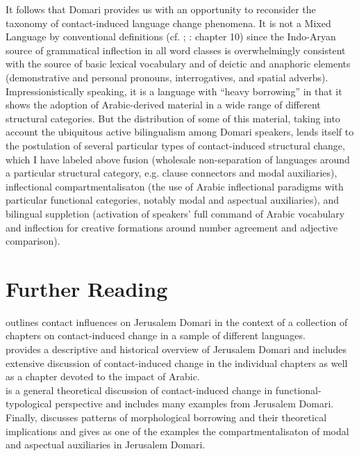 \documentclass[output=paper]{langsci/langscibook}
\begin{document}
It follows that Domari provides us with an opportunity to reconsider the taxonomy of contact-induced language change phenomena. It is not a Mixed Language by conventional definitions (cf. \citealt{BakkerMatras2013}; \citealt{Matras2009}: chapter 10) since the Indo-Aryan source of grammatical inflection in all word classes is overwhelmingly consistent with the source of basic lexical vocabulary and of deictic and anaphoric elements (demonstrative and personal pronouns, interrogatives, and spatial adverbs). Impressionistically speaking, it is a language with ``heavy borrowing'' in that it shows the adoption of Arabic-derived material in a wide range of different structural categories. But the distribution of some of this material, taking into account the ubiquitous active bilingualism among Domari speakers,  lends itself to the postulation of several particular types of contact-induced structural change, which I have labeled above fusion (wholesale non-separation of languages around a particular structural category, e.g. clause connectors and modal auxiliaries), inflectional compartmentalisaton (the use of Arabic inflectional paradigms with particular functional categories, notably modal and aspectual auxiliaries), and bilingual suppletion (activation of speakers’ full command of Arabic vocabulary and inflection for creative formations around number agreement and adjective comparison).

\section*{Further Reading}

\citet{Matras2007Domari} outlines contact influences on Jerusalem Domari in the context of a collection of chapters on contact-induced change in a sample of different languages.\\ \citet{Matras2012} provides a descriptive and historical overview of Jerusalem Domari and includes extensive discussion of contact-induced change in the individual chapters as well as a chapter devoted to the impact of Arabic.\\ \citet{Matras2009} is a general theoretical discussion of contact-induced change in functional-typological perspective and includes many examples from Jerusalem Domari.\\ Finally, \citet{Matras2015} discusses patterns of morphological borrowing and their theoretical implications and gives as one of the examples the compartmentalisaton of modal and aspectual auxiliaries in Jerusalem Domari. 
\end{document}
